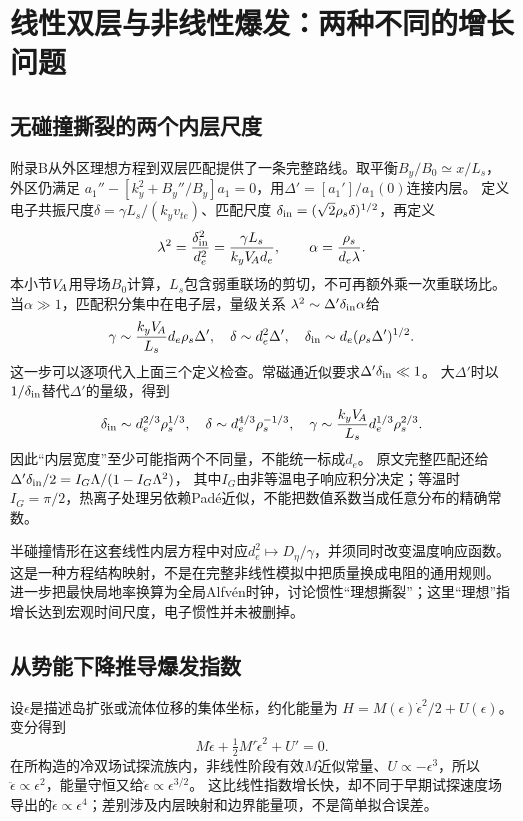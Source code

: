\documentclass[UTF8,a4paper,11pt,openany,fontset=fandol]{ctexbook}
\begin{document}
\section{线性双层与非线性爆发：两种不同的增长问题}
\subsection{无碰撞撕裂的两个内层尺度}
\citet{E512}附录B从外区理想方程到双层匹配提供了一条完整路线。取平衡$B_y/B_0\simeq x/L_s$，外区仍满足
$a_1''-[k_y^2+B_y''/B_y]a_1=0$，用$\Delta'=[a_1']/a_1(0)$连接内层。
定义电子共振尺度$\delta=\gamma L_s/(k_yv_{te})$、匹配尺度
$\delta_{\rm in}=(\sqrt2\rho_s\delta)^{1/2}$，再定义
\begin{equation}
 \lambda^2={\delta_{\rm in}^2\over d_e^2}={\gamma L_s\over k_yV_{\!A} d_e},\qquad
 \alpha={\rho_s\over d_e\lambda}.
\end{equation}
本小节$V_{\!A}$用导场$B_0$计算，$L_s$包含弱重联场的剪切，不可再额外乘一次重联场比。
当$\alpha\gg1$，匹配积分集中在电子层，量级关系
$\lambda^2\sim\Delta'\delta_{\rm in}\alpha$给
\begin{equation}
 \gamma\sim{k_yV_{\!A}\over L_s}d_e\rho_s\Delta',\quad
 \delta\sim d_e^2\Delta',\quad
 \delta_{\rm in}\sim d_e(\rho_s\Delta')^{1/2}.
\end{equation}
这一步可以逐项代入上面三个定义检查。常磁通近似要求$\Delta'\delta_{\rm in}\ll1$。
大$\Delta'$时以$1/\delta_{\rm in}$替代$\Delta'$的量级，得到
\begin{equation}
 \delta_{\rm in}\sim d_e^{2/3}\rho_s^{1/3},\quad
 \delta\sim d_e^{4/3}\rho_s^{-1/3},\quad
 \gamma\sim{k_yV_{\!A}\over L_s}d_e^{1/3}\rho_s^{2/3}.
\end{equation}
因此“内层宽度”至少可能指两个不同量，不能统一标成$d_e$。
原文完整匹配还给$\Delta'\delta_{\rm in}/2=I_G\Lambda/(1-I_G\Lambda^2)$，
其中$I_G$由非等温电子响应积分决定；等温时$I_G=\pi/2$，热离子处理另依赖Padé近似，不能把数值系数当成任意分布的精确常数。

半碰撞情形在这套线性内层方程中对应$d_e^2\mapsto D_\eta/\gamma$，并须同时改变温度响应函数。
这是一种方程结构映射，不是在完整非线性模拟中把质量换成电阻的通用规则。
\citet{L210}进一步把最快局地率换算为全局Alfvén时钟，讨论惯性“理想撕裂”；这里“理想”指增长达到宏观时间尺度，电子惯性并未被删掉。

\subsection{从势能下降推导爆发指数}
设$\epsilon$是描述岛扩张或流体位移的集体坐标，约化能量为
$H=M(\epsilon)\dot\epsilon^2/2+U(\epsilon)$。
变分得到
\begin{equation}
 M\ddot\epsilon+\tfrac12M'\dot\epsilon^2+U'=0.
\end{equation}
\citet{L191}在所构造的冷双场试探流族内，非线性阶段有效$M$近似常量、$U\propto-\epsilon^3$，所以
$\ddot\epsilon\propto\epsilon^2$，能量守恒又给$\dot\epsilon\propto\epsilon^{3/2}$。
这比线性指数增长快，却不同于早期试探速度场导出的$\ddot\epsilon\propto\epsilon^4$；差别涉及内层映射和边界能量项，不是简单拟合误差。
\end{document}
